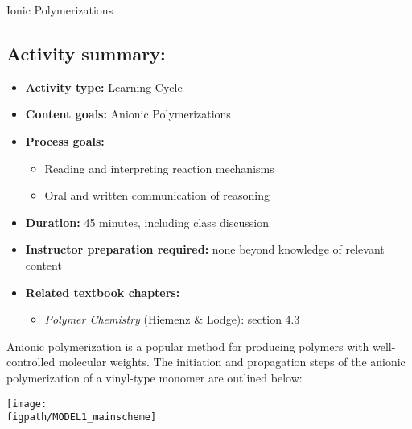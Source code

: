 \begin{activity}{Ionic Polymerizations}
\begin{instructornotes}
	\subsection*{Activity summary:}
	\begin{itemize}
		\item \textbf{Activity type:} Learning Cycle
		\item \textbf{Content goals:} Anionic Polymerizations
		\item \textbf{Process goals:} %
			\begin{itemize}
				\item Reading and interpreting reaction mechanisms
				\item Oral and written communication of reasoning
			\end{itemize}
		\item \textbf{Duration:} 45 minutes, including class discussion
		\item \textbf{Instructor preparation required:} none beyond knowledge of relevant content
		\item \textbf{Related textbook chapters:}
			\begin{itemize}
				\item \emph{Polymer Chemistry} (Hiemenz \& Lodge): section 4.3
			\end{itemize}
	\end{itemize}
	
\end{instructornotes}


\begin{model}
	\label{\labelbase:mdl:anionic}

	Anionic polymerization is a popular method for producing polymers with well-controlled molecular weights.  The initiation and propagation steps of the anionic polymerization of a vinyl-type monomer are outlined below:
	
	\centerline{\texttt{[image: \\figpath/MODEL1\_mainscheme]}}
	
\end{model}


\begin{ctqs}


\end{ctqs}
\end{activity}
